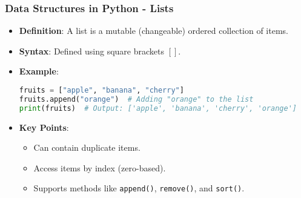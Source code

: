 \documentclass{beamer}
\begin{document}
\begin{frame}[fragile]
    \frametitle{Data Structures in Python - Lists}
    \begin{itemize}
        \item \textbf{Definition}: A list is a mutable (changeable) ordered collection of items.
        \item \textbf{Syntax}: Defined using square brackets $[]$.
        \item \textbf{Example}:
        \begin{lstlisting}[language=Python]
fruits = ["apple", "banana", "cherry"]
fruits.append("orange")  # Adding "orange" to the list
print(fruits)  # Output: ['apple', 'banana', 'cherry', 'orange']
\end{lstlisting}
        \item \textbf{Key Points}:
        \begin{itemize}
            \item Can contain duplicate items.
            \item Access items by index (zero-based).
            \item Supports methods like \texttt{append()}, \texttt{remove()}, and \texttt{sort()}.
        \end{itemize}
    \end{itemize}
\end{frame}
\end{document}
